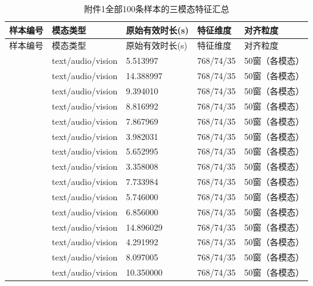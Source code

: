 \documentclass{gmcmthesis}
\begin{document}
\begingroup
\scriptsize
\begin{longtable}{C{0.27\textwidth}C{0.16\textwidth}C{0.14\textwidth}C{0.14\textwidth}C{0.14\textwidth}}
\caption{附件1全部100条样本的三模态特征汇总}\label{tab:attachment1_full}\\
\toprule 样本编号 & 模态类型 & 原始有效时长(s) & 特征维度 & 对齐粒度 \\
\midrule
\endfirsthead
\toprule 样本编号 & 模态类型 & 原始有效时长(s) & 特征维度 & 对齐粒度 \\
\midrule
\endhead
\texttt{} & text/audio/vision & 5.513997 & 768/74/35 & 50窗（各模态） \\
\texttt{} & text/audio/vision & 14.388997 & 768/74/35 & 50窗（各模态） \\
\texttt{} & text/audio/vision & 9.394010 & 768/74/35 & 50窗（各模态） \\
\texttt{} & text/audio/vision & 8.816992 & 768/74/35 & 50窗（各模态） \\
\texttt{} & text/audio/vision & 7.867969 & 768/74/35 & 50窗（各模态） \\
\texttt{} & text/audio/vision & 3.982031 & 768/74/35 & 50窗（各模态） \\
\texttt{} & text/audio/vision & 5.652995 & 768/74/35 & 50窗（各模态） \\
\texttt{} & text/audio/vision & 3.358008 & 768/74/35 & 50窗（各模态） \\
\texttt{} & text/audio/vision & 7.733984 & 768/74/35 & 50窗（各模态） \\
\texttt{} & text/audio/vision & 5.746000 & 768/74/35 & 50窗（各模态） \\
\texttt{} & text/audio/vision & 6.856000 & 768/74/35 & 50窗（各模态） \\
\texttt{} & text/audio/vision & 14.896029 & 768/74/35 & 50窗（各模态） \\
\texttt{} & text/audio/vision & 4.291992 & 768/74/35 & 50窗（各模态） \\
\texttt{} & text/audio/vision & 8.097005 & 768/74/35 & 50窗（各模态） \\
\texttt{} & text/audio/vision & 10.350000 & 768/74/35 & 50窗（各模态） \\

\end{longtable}
\end{document}
